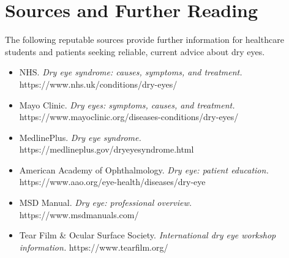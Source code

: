 \section*{Sources and Further Reading}
The following reputable sources provide further information for healthcare students and patients seeking reliable, current advice about dry eyes.
\begin{itemize}
    \item NHS. \textit{Dry eye syndrome: causes, symptoms, and treatment.} https://www.nhs.uk/conditions/dry-eyes/
    \item Mayo Clinic. \textit{Dry eyes: symptoms, causes, and treatment.} https://www.mayoclinic.org/diseases-conditions/dry-eyes/
    \item MedlinePlus. \textit{Dry eye syndrome.} https://medlineplus.gov/dryeyesyndrome.html
    \item American Academy of Ophthalmology. \textit{Dry eye: patient education.} https://www.aao.org/eye-health/diseases/dry-eye
    \item MSD Manual. \textit{Dry eye: professional overview.} https://www.msdmanuals.com/
    \item Tear Film \& Ocular Surface Society. \textit{International dry eye workshop information.} https://www.tearfilm.org/
\end{itemize}

